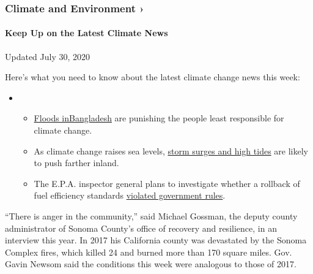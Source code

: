 \href{https://www.nytimes3xbfgragh.onion/section/climate?action=click\&pgtype=Article\&state=default\&region=MAIN_CONTENT_1\&context=storylines_keepup}{}

\hypertarget{climate-and-environment-}{%
\subsubsection{Climate and Environment
›}\label{climate-and-environment-}}

\hypertarget{keep-up-on-the-latest-climate-news}{%
\paragraph{Keep Up on the Latest Climate
News}\label{keep-up-on-the-latest-climate-news}}

Updated July 30, 2020

Here's what you need to know about the latest climate change news this
week:

\begin{itemize}
\item
  \begin{itemize}
  \tightlist
  \item
    \href{https://www.nytimes3xbfgragh.onion/2020/07/30/climate/bangladesh-floods.html?action=click\&pgtype=Article\&state=default\&region=MAIN_CONTENT_1\&context=storylines_keepup}{Floods
    in}\href{https://www.nytimes3xbfgragh.onion/2020/07/30/climate/bangladesh-floods.html?action=click\&pgtype=Article\&state=default\&region=MAIN_CONTENT_1\&context=storylines_keepup}{Bangladesh}
    are punishing the people least responsible for climate change.
  \item
    As climate change raises sea levels,
    \href{https://www.nytimes3xbfgragh.onion/2020/07/30/climate/sea-level-inland-floods.html?action=click\&pgtype=Article\&state=default\&region=MAIN_CONTENT_1\&context=storylines_keepup}{storm
    surges and high tides} are likely to push farther inland.
  \item
    The E.P.A. inspector general plans to investigate whether a rollback
    of fuel efficiency standards
    \href{https://www.nytimes3xbfgragh.onion/2020/07/27/climate/trump-fuel-efficiency-rule.html?action=click\&pgtype=Article\&state=default\&region=MAIN_CONTENT_1\&context=storylines_keepup}{violated
    government rules}.
  \end{itemize}
\end{itemize}

``There is anger in the community,'' said Michael Gossman, the deputy
county administrator of Sonoma County's office of recovery and
resilience, in an interview this year. In 2017 his California county was
devastated by the Sonoma Complex fires, which killed 24 and burned more
than 170 square miles. Gov. Gavin Newsom said the conditions this week
were analogous to those of 2017.

